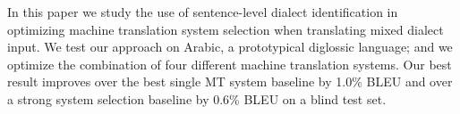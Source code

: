 In this paper we study the use of sentence-level dialect identification in optimizing machine translation system selection when translating mixed dialect input. We test our approach on Arabic, a prototypical diglossic language; and we optimize the combination of four different machine translation systems. Our best result improves over the best single MT system baseline by 1.0\% BLEU and over a strong system selection baseline by 0.6\% BLEU on a blind test set.
